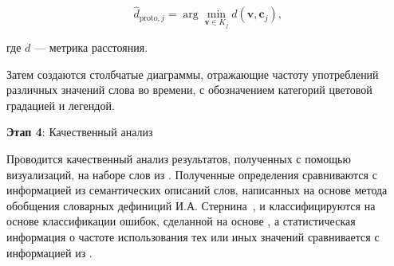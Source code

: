 \documentclass[LI,VKR]{HSEUniversity}
\begin{document}
\begin{equation}
\hat{d}_{\text{proto}, j} = \arg\min_{\mathbf{v} \in K_j} d(\mathbf{v}, \mathbf{c}_j)\text{,}
\end{equation}

где \( d \) — метрика расстояния.

Затем создаются столбчатые диаграммы,
отражающие частоту употреблений различных значений слова во времени,
с обозначением категорий цветовой градацией и легендой.

\textbf{Этап 4}: Качественный анализ

Проводится качественный анализ результатов, полученных с помощью визуализаций,
на наборе слов из \cite{TwoCenturies}.
Полученные определения сравниваются с информацией из семантических описаний слов,
написанных на основе метода обобщения словарных дефиниций И.А. Стернина~\cite{SemanticDefinitionsAndAnalysis},
и классифицируются на основе классификации ошибок,
сделанной на основе \cite{huang-etal-2021-definition},
а статистическая информация о частоте использования тех или иных значений сравнивается
с информацией из \cite{TwoCenturies}.

%
%
%
%
%
\end{document}
